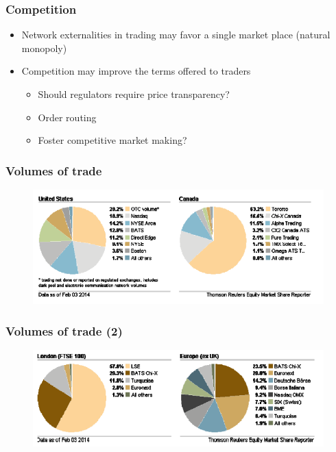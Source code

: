 \documentclass[english,10pt]{beamer}
\theoremstyle{definition}
\begin{document}
\begin{frame}
\frametitle{Competition}

\begin{itemize}

\item Network externalities in trading may favor a single market place (natural monopoly)

\item Competition may improve the terms offered to traders

\begin{itemize}
\item Should regulators require price transparency?
\item Order routing
\item Foster competitive market making?
\end{itemize}
\end{itemize}

\end{frame}





\begin{frame}
\frametitle{Volumes of trade}

\begin{figure}
\includegraphics[width=.7\paperwidth]{pics/Image_Equity}
\end{figure}


\end{frame}


\begin{frame}
\frametitle{Volumes of trade (2)}

\begin{figure}
\includegraphics[width=.7\paperwidth]{pics/Image_Equity2}
\end{figure}


\end{frame}
\end{document}
